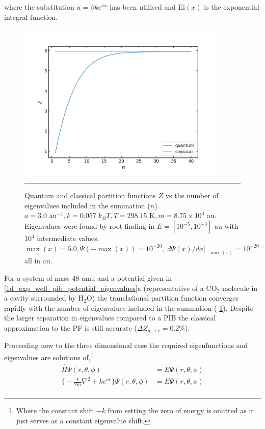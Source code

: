 \documentclass[../main.tex]{subfiles}
\begin{document}
where the substitution $u = \beta k e^{ax}$ has been utilised and $\text{Ei}(x)$ is the exponential integral function.

\begin{figure}[h!]
	\centering
	\includegraphics[height=7.5cm]{4/figs/1d_exp_well_z_qunatum_classical}
	\vspace{0.2cm}
	\hrule
	\caption{Quantum and classical partition functions $Z$ vs the number of eigenvalues included in the summation ($n$). $a = 3.0 \text{ au}^{-1}, k = 0.057 \; k_B T, T = 298.15 \text{ K}, m =8.75 \times 10^4$ au. Eigenvalues were found by root finding in $E= [10^{-5}, 10^{-3}]$ au with $10^4$ intermediate values. $\max(x) = 5.0, \Psi(-\!\max(x)) = 10^{-20},\; d\Psi(x)/dx|_{-\!\max(x)} = 10^{-20}$ all in au.} 
	\label{1d_exp_well_z_qunatum_classical}
\end{figure}

For a system of mass 48 amu and a potential given in \figurename{ \ref{1d_exp_well_pib_potential_eigenvalues}a} (representative of a CO$_2$ molecule in a cavity surrounded by H$_2$O) the translational partition function converges rapidly with the number of eigenvalues included in the summation (\figurename{ \ref{1d_exp_well_z_qunatum_classical}}). Despite the larger separation in eigenvalues compared to a PIB the classical approximation to the PF is still accurate ($\Delta Z_{q\rightarrow c} = 0.2\%$).

\clearpage
Proceeding now to the three dimensional case the required eigenfunctions and eigenvalues are solutions of,\footnote{Where the constant shift $-k$ from setting the zero of energy is omitted as it just serves as a constant eigenvalue shift.}
\begin{equation}
\begin{aligned}
\hat{H}\Psi(r, \theta, \phi) &= E \Psi(r, \theta, \phi) \\
{\Big \{} -\frac{1}{2m} \nabla^2 + k e^{ar} {\Big \}}\Psi(r, \theta, \phi) &= E\Psi(r, \theta, \phi) \\ 
\end{aligned}
\label{3d_exp_well_SE}
\end{equation}
\end{document}
